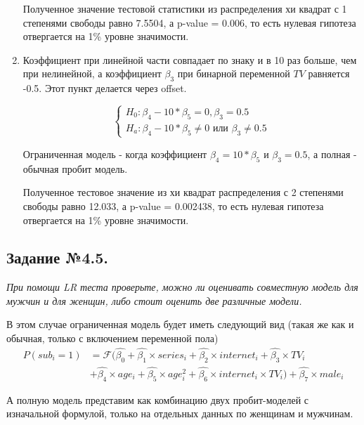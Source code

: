 \documentclass[a4paper,12pt]{article}
\begin{document}
\begin{enumerate}
	Полученное значение тестовой статистики из распределения хи квадрат с 1 степенями свободы равно 7.5504, а p-value = 0.006, то есть нулевая гипотеза отвергается на 1\% уровне значимости.
	
	\item Коэффициент при линейной части совпадает по знаку и в 10 раз больше, чем при нелинейной, а коэффициент $\beta_3$ при бинарной переменной $TV$ равняется -0.5. Этот пункт делается через offset.
	
	\begin{equation*}
		\begin{cases}
			H_0:\beta_4-10*\beta_5=0, \beta_3=0.5\\
			H_a: \beta_4-10*\beta_5 \ne 0  \text{ или }  \beta_3 \ne 0.5
		\end{cases}
	\end{equation*}		
	
	Ограниченная модель - когда коэффициент $\beta_4=10*\beta_5$ и $\beta_3=0.5$, а полная - обычная пробит модель. 
	
	Полученное тестовое значение из хи квадрат распределения с 2 степенями свободы равно 12.033, а p-value = 0.002438, то есть нулевая гипотеза отвергается на 1\% уровне значимости.
		
		\end{enumerate}
	
	
	\subsection{Задание №4.5.}
	\textit{
	При помощи LR теста проверьте, можно ли оценивать совместную модель для мужчин и для женщин, либо стоит оценить две различные модели. }
	
	\vspace{0.2cm}
	
	В этом случае ограниченная модель будет иметь следующий вид (такая же как и обычная, только с включением переменной пола)
	\begin{align*}
		P(sub_i=1)&= \mathcal{F} (\hat{\beta_0} + \hat{\beta_1} \times series_i+ \hat{\beta_2} \times internet_i  +\hat{\beta_3}  \times TV_i \\&+ \hat{\beta_4} \times age_i+ \hat{\beta_5}\times age_i^2 +\hat{\beta_6} \times internet_i\times TV_i)+\hat{\beta_7}\times male_i
	\end{align*}
	
	А полную модель представим как комбинацию двух пробит-моделей с изначальной формулой, только на отдельных данных по женщинам и мужчинам.
	
\end{document}
